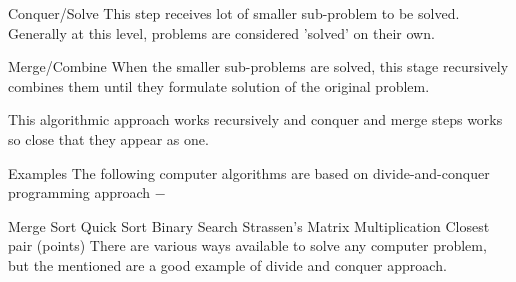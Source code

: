 \documentclass{beamer}
\begin{document}
\begin{frame}
Conquer/Solve
This step receives lot of smaller sub-problem to be solved. Generally at this level, problems are considered 'solved' on their own.

Merge/Combine
When the smaller sub-problems are solved, this stage recursively combines them until they formulate solution of the original problem.
\end{frame}
\begin{frame}
This algorithmic approach works recursively and conquer and merge steps works so close that they appear as one.

Examples
The following computer algorithms are based on divide-and-conquer programming approach −
\end{frame}
\begin{frame}
Merge Sort
Quick Sort
Binary Search
Strassen's Matrix Multiplication
Closest pair (points)
There are various ways available to solve any computer problem, but the mentioned are a good example of divide and conquer approach.

\end{frame}
\end{document}
